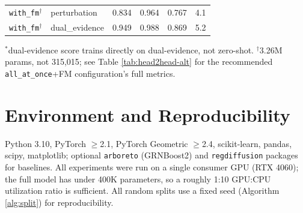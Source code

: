 \documentclass{article}
\theoremstyle{plain}
\theoremstyle{definition}
\begin{document}
\begin{table}[h]
\begin{center}
\begin{small}
\begin{tabular}{llcccc}
\texttt{with\_fm}$^\dagger$ & perturbation & 0.834 & 0.964 & 0.767 & 4.1 \\
\texttt{with\_fm}$^\dagger$ & dual\_evidence & 0.949 & 0.988 & 0.869 & 5.2 \\
\bottomrule
\end{tabular}
\end{small}
\end{center}
{\footnotesize $^*$dual-evidence score trains directly on dual-evidence, not zero-shot. $^\dagger$3.26M params, not
315{,}015; see Table \ref{tab:head2head-alt} for the recommended \texttt{all\_at\_once}+FM configuration's full metrics.}
\end{table}

\section{Environment and Reproducibility}
Python 3.10, PyTorch $\geq$2.1, PyTorch Geometric $\geq$2.4, scikit-learn,
pandas, scipy, matplotlib; optional \texttt{arboreto} (GRNBoost2) and
\texttt{regdiffusion} packages for baselines. All experiments were run on a
single consumer GPU (RTX 4060); the full model has under 400K parameters, so a
roughly 1:10 GPU:CPU utilization ratio is sufficient. All random splits use a
fixed seed (Algorithm \ref{alg:split}) for reproducibility.
\end{document}
